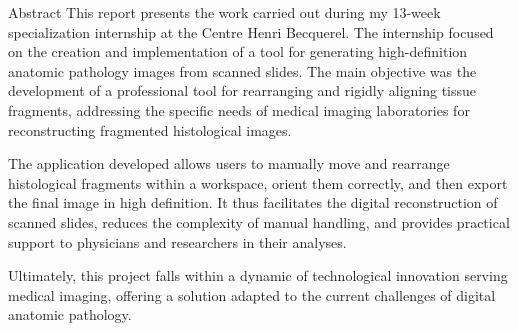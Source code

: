 \documentclass[12pt,a4paper]{report}
\begin{document}
\begin{resume}{Abstract}
This report presents the work carried out during my 13-week specialization internship at the Centre Henri Becquerel. The internship focused on the creation and implementation of a tool for generating high-definition anatomic pathology images from scanned slides. The main objective was the development of a professional tool for rearranging and rigidly aligning tissue fragments, addressing the specific needs of medical imaging laboratories for reconstructing fragmented histological images.

The application developed allows users to manually move and rearrange histological fragments within a workspace, orient them correctly, and then export the final image in high definition. It thus facilitates the digital reconstruction of scanned slides, reduces the complexity of manual handling, and provides practical support to physicians and researchers in their analyses.

Ultimately, this project falls within a dynamic of technological innovation serving medical imaging, offering a solution adapted to the current challenges of digital anatomic pathology.
\end{resume}
\end{document}
